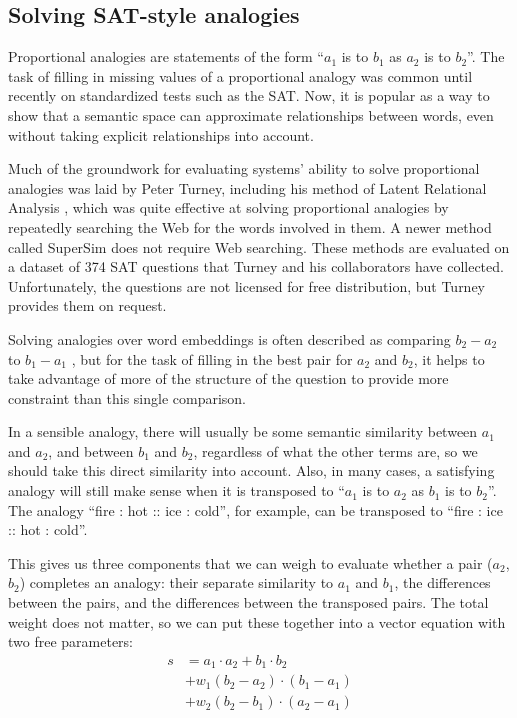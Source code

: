 \documentclass[letterpaper]{article}
\begin{document}
\subsection{Solving SAT-style analogies}

Proportional analogies are statements of the form ``$a_1$ is to $b_1$ as $a_2$
is to $b_2$''. The task of filling in missing values of a proportional analogy
was common until recently on standardized tests such as the SAT. Now, it is
popular as a way to show that a semantic space can approximate relationships
between words, even without taking explicit relationships into account.

Much of the groundwork for evaluating systems' ability to solve proportional
analogies was laid by Peter Turney, including his method of Latent Relational
Analysis \cite{turney2005lra}, which was quite effective at solving
proportional analogies by repeatedly searching the Web for the words involved
in them. A newer method called SuperSim \cite{turney2013distributional} does
not require Web searching. These methods are evaluated on a dataset of 374 SAT
questions that Turney and his collaborators have collected. Unfortunately, the
questions are not licensed for free distribution, but Turney provides them on
request.

Solving analogies over word embeddings is often described as comparing $b_2 -
a_2$ to $b_1 - a_1$ \cite{mikolov2013word2vec}, but for the task of filling in
the best pair for $a_2$ and $b_2$, it helps to take advantage of more of the
structure of the question to provide more constraint than this single comparison.

In a sensible analogy, there will usually be some semantic similarity between
$a_1$ and $a_2$, and between $b_1$ and $b_2$, regardless of what the other
terms are, so we should take this direct similarity into account. Also, in many
cases, a satisfying analogy will still make sense when it is transposed to
``$a_1$ is to $a_2$ as $b_1$ is to $b_2$''. The analogy ``fire : hot :: ice :
cold'', for example, can be transposed to ``fire : ice :: hot : cold''.

This gives us three components that we can weigh to evaluate whether a pair
($a_2$, $b_2$) completes an analogy: their separate similarity to $a_1$ and $b_1$,
the differences between the pairs, and the differences between the transposed pairs.
The total weight does not matter, so we can put these together into a vector
equation with two free parameters:
\begin{equation}
    \begin{split}
        s &= a_1 \cdot a_2 + b_1 \cdot b_2\\
          &  + w_1(b_2 - a_2) \cdot (b_1 - a_1)\\
          &  + w_2(b_2 - b_1) \cdot (a_2 - a_1)
    \end{split}
\end{equation}
\end{document}
